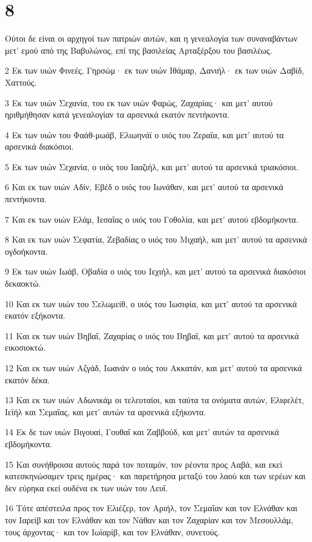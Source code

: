 \chapter{8}

\par Ούτοι δε είναι οι αρχηγοί των πατριών αυτών, και η γενεαλογία των συναναβάντων μετ' εμού από της Βαβυλώνος, επί της βασιλείας Αρταξέρξου του βασιλέως.
\par 2 Εκ των υιών Φινεές, Γηρσώμ· εκ των υιών Ιθάμαρ, Δανιήλ· εκ των υιών Δαβίδ, Χαττούς.
\par 3 Εκ των υιών Σεχανία, του εκ των υιών Φαρώς, Ζαχαρίας· και μετ' αυτού ηριθμήθησαν κατά γενεαλογίαν τα αρσενικά εκατόν πεντήκοντα.
\par 4 Εκ των υιών του Φαάθ-μωάβ, Ελιωηνάϊ ο υιός του Ζεραΐα, και μετ' αυτού τα αρσενικά διακόσιοι.
\par 5 Εκ των υιών Σεχανία, ο υιός του Ιααζιήλ, και μετ' αυτού τα αρσενικά τριακόσιοι.
\par 6 Και εκ των υιών Αδίν, Εβέδ ο υιός του Ιωνάθαν, και μετ' αυτού τα αρσενικά πεντήκοντα.
\par 7 Και εκ των υιών Ελάμ, Ιεσαΐας ο υιός του Γοθολία, και μετ' αυτού εβδομήκοντα.
\par 8 Και εκ των υιών Σεφατία, Ζεβαδίας ο υιός του Μιχαήλ, και μετ' αυτού τα αρσενικά ογδοήκοντα.
\par 9 Εκ των υιών Ιωάβ, Οβαδία ο υιός του Ιεχιήλ, και μετ' αυτού τα αρσενικά διακόσιοι δεκαοκτώ.
\par 10 Και εκ των υιών του Σελωμείθ, ο υιός του Ιωσιφία, και μετ' αυτού τα αρσενικά εκατόν εξήκοντα.
\par 11 Και εκ των υιών Βηβαΐ, Ζαχαρίας ο υιός του Βηβαΐ, και μετ' αυτού τα αρσενικά εικοσιοκτώ.
\par 12 Και εκ των υιών Αζγάδ, Ιωανάν ο υιός του Ακκατάν, και μετ' αυτού τα αρσενικά εκατόν δέκα.
\par 13 Και εκ των υιών Αδωνικάμ οι τελευταίοι, και ταύτα τα ονόματα αυτών, Ελιφελέτ, Ιεϊήλ και Σεμαΐας, και μετ' αυτών τα αρσενικά εξήκοντα.
\par 14 Εκ δε των υιών Βιγουαί, Γουθαΐ και Ζαββούδ, και μετ' αυτών τα αρσενικά εβδομήκοντα.
\par 15 Και συνήθροισα αυτούς παρά τον ποταμόν, τον ρέοντα προς Ααβά, και εκεί κατεσκηνώσαμεν τρεις ημέρας· και παρετήρησα μεταξύ του λαού και των ιερέων και δεν εύρηκα εκεί ουδένα εκ των υιών του Λευΐ.
\par 16 Τότε απέστειλα προς τον Ελιέζερ, τον Αριήλ, τον Σεμαΐαν και τον Ελνάθαν και τον Ιαρείβ και τον Ελνάθαν και τον Νάθαν και τον Ζαχαρίαν και τον Μεσουλλάμ, τους άρχοντας· και τον Ιωϊαρίβ, και τον Ελνάθαν, συνετούς.
